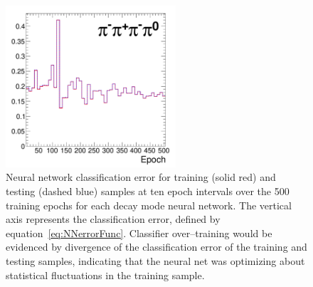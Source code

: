 \begin{figure}[thbp]
\begin{center}
     \includegraphics*[height=60mm]{tanc_chapter/figures/overtrainCheck_ThreeProngOnePiZero.pdf}
   \caption[Neural network over--training validation plots]{Neural network
   classification error for training (solid red) and testing (dashed blue)
   samples at ten epoch intervals over the 500 training epochs for each decay
   mode neural network.  The vertical axis represents the classification error,
   defined by equation~\ref{eq:NNerrorFunc}.  Classifier over--training would be
   evidenced by divergence of the classification error of the training and
   testing samples, indicating that the neural net was optimizing about
   statistical fluctuations in the training sample.  }
   \label{fig:overTrainCheck}
   \end{center}
\end{figure}


